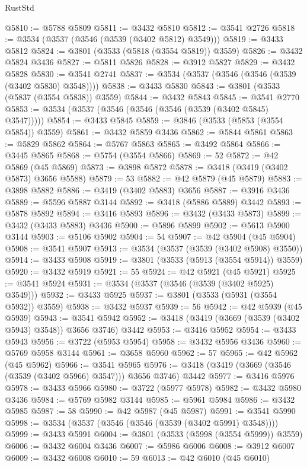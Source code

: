 \begin{lexlean}{RustStd}
\begin{coremodule}
@5810 := @5788 @5809
@5811 := @3432 @5810
@5812 := @3541 @2726
@5818 := @3534 (@3537 (@3546 (@3539 (@3402 @5812) @3549)))
@5819 := @3433 @5812
@5824 := @3801 (@3533 (@5818 (@3554 @5819)) @3559)
@5826 := @3432 @5824 @3436
@5827 := @5811 @5826
@5828 := @3912 @5827
@5829 := @3432 @5828
@5830 := @3541 @2741
@5837 := @3534 (@3537 (@3546 (@3546 (@3539 (@3402 @5830) @3548))))
@5838 := @3433 @5830
@5843 := @3801 (@3533 (@5837 (@3554 @5838)) @3559)
@5844 := @3432 @5843
@5845 := @3541 @2770
@5853 := @3534 (@3537 (@3546 (@3546 (@3546 (@3539 (@3402 @5845) @3547)))))
@5854 := @3433 @5845
@5859 := @3846 (@3533 (@5853 (@3554 @5854)) @3559)
@5861 := @3432 @5859 @3436
@5862 := @5844 @5861
@5863 := @5829 @5862
@5864 := @5767 @5863
@5865 := @3492 @5864
@5866 := @3445 @5865
@5868 := @5754 (@3554 @5866)
@5869 := 52
@5872 := @42 @5869 (@45 @5869)
@5873 := @3898 @5872
@5878 := @3418 (@3419 (@3402 @5873) @3656 @5588)
@5879 := 53
@5882 := @42 @5879 (@45 @5879)
@5883 := @3898 @5882
@5886 := @3419 (@3402 @5883) @3656
@5887 := @3916 @3436
@5889 := @5596 @5887 @3144
@5892 := @3418 (@5886 @5889) @3442
@5893 := @5878 @5892
@5894 := @3416 @5893
@5896 := @3432 (@3433 @5873)
@5899 := @3432 (@3433 @5883) @3436
@5900 := @5896 @5899
@5902 := @5613 @5900 @3144
@5903 := @5106 @5902
@5904 := 54
@5907 := @42 @5904 (@45 @5904)
@5908 := @3541 @5907
@5913 := @3534 (@3537 (@3539 (@3402 @5908) @3550))
@5914 := @3433 @5908
@5919 := @3801 (@3533 (@5913 (@3554 @5914)) @3559)
@5920 := @3432 @5919
@5921 := 55
@5924 := @42 @5921 (@45 @5921)
@5925 := @3541 @5924
@5931 := @3534 (@3537 (@3546 (@3539 (@3402 @5925) @3549)))
@5932 := @3433 @5925
@5937 := @3801 (@3533 (@5931 (@3554 @5932)) @3559)
@5938 := @3432 @5937
@5939 := 56
@5942 := @42 @5939 (@45 @5939)
@5943 := @3541 @5942
@5952 := @3418 (@3419 (@3669 (@3539 (@3402 @5943) @3548)) @3656 @3746) @3442
@5953 := @3416 @5952
@5954 := @3433 @5943
@5956 := @3722 (@5953 @5954)
@5958 := @3432 @5956 @3436
@5960 := @5769 @5958 @3144
@5961 := @3658 @5960
@5962 := 57
@5965 := @42 @5962 (@45 @5962)
@5966 := @3541 @5965
@5976 := @3418 (@3419 (@3669 (@3546 (@3539 (@3402 @5966) @3547))) @3656 @3746) @3442
@5977 := @3416 @5976
@5978 := @3433 @5966
@5980 := @3722 (@5977 @5978)
@5982 := @3432 @5980 @3436
@5984 := @5769 @5982 @3144
@5985 := @5961 @5984
@5986 := @3432 @5985
@5987 := 58
@5990 := @42 @5987 (@45 @5987)
@5991 := @3541 @5990
@5998 := @3534 (@3537 (@3546 (@3546 (@3539 (@3402 @5991) @3548))))
@5999 := @3433 @5991
@6004 := @3801 (@3533 (@5998 (@3554 @5999)) @3559)
@6006 := @3432 @6004 @3436
@6007 := @5986 @6006
@6008 := @3912 @6007
@6009 := @3432 @6008
@6010 := 59
@6013 := @42 @6010 (@45 @6010)

\end{coremodule}
\end{lexlean}
